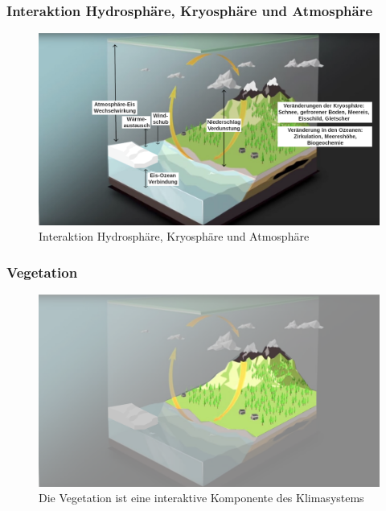 \begin{frame}
	\frametitle{Interaktion Hydrosphäre, Kryosphäre und Atmosphäre}
	\begin{figure}
		\centering
		\includegraphics{bilder/WMO_Cycles_factors_waterAndIce.png}
		\caption{Interaktion Hydrosphäre, Kryosphäre und Atmosphäre}
	\end{figure}
\end{frame}

\begin{frame}
	\frametitle{Vegetation}
	
	\begin{figure}
		\centering
		\includegraphics{bilder/WMO_Cycles_land.png}
		\caption{Die Vegetation ist eine interaktive Komponente des Klimasystems}
	\end{figure}
\end{frame}

